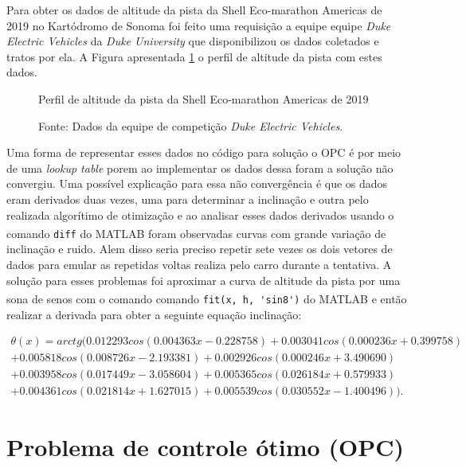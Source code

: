 Para obter os dados de altitude da pista da Shell Eco-marathon Americas de 2019 no Kartódromo de Sonoma foi feito uma requisição a equipe
equipe \textit{Duke Electric Vehicles} da \textit{Duke University} que disponibilizou os dados coletados e tratos por ela. A Figura apresentada \ref{fig:altitude_pista} 
o perfil de altitude da pista com estes dados.

\begin{figure}[h]
    \centering
    \caption{Perfil de altitude da pista da Shell Eco-marathon Americas de 2019}
    
    \label{fig:altitude_pista}
    \caption*{\footnotesize{Fonte: Dados da equipe de competição \textit{Duke Electric Vehicles}.}}
\end{figure}

Uma forma de representar esses dados no código para solução o OPC é por meio de uma \textit{lookup table} porem ao implementar os dados dessa foram
a solução não convergiu. Uma possível explicação para essa não convergência é que os dados eram derivados duas vezes, uma para determinar a inclinação e outra pelo 
realizada algorítimo de otimização e ao analisar esses dados derivados usando o comando \lstinline[style=Matlab-editor]{diff} do MATLAB\textsuperscript{\textregistered} foram observadas curvas
com grande variação de inclinação e ruido. Alem disso seria preciso repetir sete vezes os dois vetores de dados para emular as repetidas voltas realiza pelo carro durante a tentativa.
A solução para esses problemas foi aproximar a curva de altitude da pista por uma sona de senos com o comando comando \lstinline[style=Matlab-editor]{fit(x, h, 'sin8')} do MATLAB\textsuperscript{\textregistered} 
e então realizar a derivada para obter a seguinte equação inclinação:

\begin{multline}
    \label{eq:modeloTheta}
        \theta(x) = arctg(0.012293 cos(0.004363 x - 0.228758) 
        +0.003041 cos(0.000236 x + 0.399758) \\
        +0.005818 cos(0.008726 x - 2.193381) 
        +0.002926 cos(0.000246 x + 3.490690) \\
        +0.003958 cos(0.017449 x - 3.058604) 
        +0.005365 cos(0.026184 x + 0.579933) \\
        +0.004361 cos(0.021814 x + 1.627015) 
        +0.005539 cos(0.030552 x - 1.400496)).
\end{multline}

\section{Problema de controle ótimo (OPC)}

